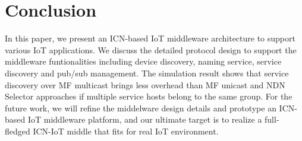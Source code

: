 \section{Conclusion}
In this paper, we present an ICN-based IoT middleware architecture to support various IoT applications. We discuss the detailed protocol design to support the middleware funtionalities including device discovery, naming service, service discovery and pub/sub management. The simulation result shows that 
service discovery over MF multicast brings less overhead than MF unicast and NDN Selector approaches if multiple service hosts belong to the same group. For the future work, we will refine the middelware design details and prototype an ICN-based IoT middleware platform, and our ultimate target is to realize a full-fledged ICN-IoT middle that fits for real IoT environment.


